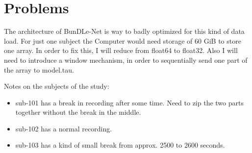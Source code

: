 \documentclass{article}
\begin{document}
\section{Problems}
The architecture of BunDLe-Net is way to badly optimized for this kind of data load. For just one subject the Computer would need storage of 60 GiB to store one array. 
In order to fix this, I will reduce from float64 to float32. Also I will need to introduce a window mechanism, in order to sequentially send one part of the array to model.tau. 

Notes on the subjects of the study: 
\begin{itemize}
    \item sub-101 has a break in recording after some time. Need to zip the two parts together without the break in the middle.
    \item sub-102 has a normal recording. 
    \item sub-103 has a kind of small break from approx. 2500 to 2600 seconds. 
    
    
\end{itemize}
\end{document}
